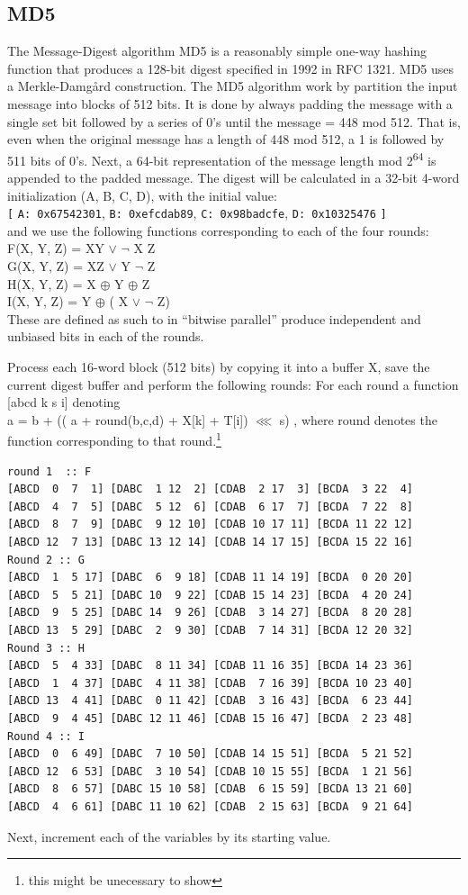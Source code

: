 \documentclass[a4paper]{article}
\begin{document}
\subsection{MD5}
\label{MD5alg}
The Message-Digest algorithm MD5 is a reasonably simple one-way hashing function that produces a 128-bit digest specified in 1992 in RFC 1321\cite{}. MD5 uses a Merkle-Damgård construction.
The MD5 algorithm work by partition the input message into blocks of 512 bits. It is done by always padding the message with a single set bit followed by a series of 0's until the message = 448 mod 512. That is, even when the original message has a length of 448 mod 512, a 1 is followed by 511 bits of 0's.
Next, a 64-bit representation of the message length mod 2\textsuperscript{64} is appended to the padded message.
The digest will be calculated in a 32-bit 4-word initialization (A, B, C, D), with the initial value:\\
\texttt{[} \texttt{A: 0x67542301}, \texttt{B: 0xefcdab89}, \texttt{C: 0x98badcfe}, \texttt{D: 0x10325476} \texttt{]}\\
and we use the following functions corresponding to each of the four rounds:\\
F(X, Y, Z) = XY \(\vee\) \(\neg{}\) X Z\\
G(X, Y, Z) = XZ \(\vee\) Y \(\neg{}\) Z\\
H(X, Y, Z) = X \(\oplus\) Y \(\oplus\) Z\\
I(X, Y, Z) = Y \(\oplus\) ( X \(\vee\) \(\neg{}\) Z)\\
These are defined as such to in ``bitwise parallel'' produce independent and unbiased bits in each of the rounds.

Process each 16-word block (512 bits) by copying it into a buffer X,
save the current digest buffer and perform the following rounds:
For each round a function [abcd k s i] denoting\\
a = b + (( a + round(b,c,d) + X[k] + T[i]) \(\lll\) s)
, where round denotes the function corresponding to that round.\footnote{this might be unecessary to show}
\begin{verbatim}
round 1  :: F
[ABCD  0  7  1] [DABC  1 12  2] [CDAB  2 17  3] [BCDA  3 22  4]
[ABCD  4  7  5] [DABC  5 12  6] [CDAB  6 17  7] [BCDA  7 22  8]
[ABCD  8  7  9] [DABC  9 12 10] [CDAB 10 17 11] [BCDA 11 22 12]
[ABCD 12  7 13] [DABC 13 12 14] [CDAB 14 17 15] [BCDA 15 22 16]
Round 2 :: G
[ABCD  1  5 17] [DABC  6  9 18] [CDAB 11 14 19] [BCDA  0 20 20]
[ABCD  5  5 21] [DABC 10  9 22] [CDAB 15 14 23] [BCDA  4 20 24]
[ABCD  9  5 25] [DABC 14  9 26] [CDAB  3 14 27] [BCDA  8 20 28]
[ABCD 13  5 29] [DABC  2  9 30] [CDAB  7 14 31] [BCDA 12 20 32]
Round 3 :: H
[ABCD  5  4 33] [DABC  8 11 34] [CDAB 11 16 35] [BCDA 14 23 36]
[ABCD  1  4 37] [DABC  4 11 38] [CDAB  7 16 39] [BCDA 10 23 40]
[ABCD 13  4 41] [DABC  0 11 42] [CDAB  3 16 43] [BCDA  6 23 44]
[ABCD  9  4 45] [DABC 12 11 46] [CDAB 15 16 47] [BCDA  2 23 48]
Round 4 :: I
[ABCD  0  6 49] [DABC  7 10 50] [CDAB 14 15 51] [BCDA  5 21 52]
[ABCD 12  6 53] [DABC  3 10 54] [CDAB 10 15 55] [BCDA  1 21 56]
[ABCD  8  6 57] [DABC 15 10 58] [CDAB  6 15 59] [BCDA 13 21 60]
[ABCD  4  6 61] [DABC 11 10 62] [CDAB  2 15 63] [BCDA  9 21 64]
\end{verbatim}
Next, increment each of the variables by its starting value.
\end{document}
